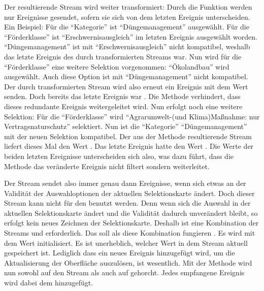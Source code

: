 Der resultierende Stream wird weiter transformiert: Durch die Funktion   werden nur Ereignisse gesendet,
sofern sie sich von dem letzten Ereignis unterscheiden.
Ein Beispiel: Für die \enquote{Kategorie} ist \enquote{Düngemanagement} ausgewählt.
Für die \enquote{Förderklasse} ist \enquote{Erschwernisausgleich} im letzten Ereignis ausgewählt worden.
\enquote{Düngemanagement} ist mit \enquote{Erschwernisausgleich} nicht kompatibel, weshalb das letzte Ereignis des durch  transformierten Streams  war.
Nun wird für die \enquote{Förderklasse} eine weitere Selektion vorgenommen: \enquote{Ökolandbau} wird ausgewählt.
Auch diese Option ist mit \enquote{Düngemanagement} nicht kompatibel.
Der durch  transformierten Stream wird also erneut ein Ereignis mit dem Wert  senden.
Doch bereits das letzte Ereignis war .
Die Methode  verhindert,
dass dieses redundante Ereignis weitergeleitet wird.
Nun erfolgt noch eine weitere Selektion: Für die \enquote{Förderklasse} wird \enquote{Agrarumwelt-(und Klima)Maßnahme: nur Vertragsnaturschutz} selektiert.
Nun ist die \enquote{Kategorie} \enquote{Düngemanagement} mit der neuen Selektion kompatibel.
Der aus der Methode  resultierende Stream liefert dieses Mal den Wert .
Das letzte Ereignis hatte den Wert .
Die Werte der beiden letzten Ereignisse unterscheiden sich also,
was dazu führt,
dass die Methode  das veränderte Ereignis nicht filtert sondern weiterleitet.

Der Stream  sendet also immer genau dann Ereignisse,
wenn sich etwas an der Validität der Auswahloptionen der aktuellen Selektionskarte ändert.
Doch dieser Stream kann nicht für den  benutzt werden.
Denn wenn sich die Auswahl in der aktuellen Selektionskarte ändert
und die Validität dadurch unverändert bleibt,
so erfolgt kein neues Zeichnen der Selektionskarte.
Deshalb ist eine Kombination der Streams  und  erforderlich.
Das   soll als diese Kombination fungieren .
Es wird mit dem Wert  initialisiert.
Es ist unerheblich, welcher Wert in dem Stream aktuell gespeichert ist.
Lediglich dass ein neues Ereignis hinzugefügt wird,
um die Aktualisierung der Oberfläche auszulösen,
ist wesentlich.
Mit der Methode  wird nun sowohl auf den Stream   als auch auf   gehorcht. 
Jedes empfangene Ereignis wird dabei dem   hinzugefügt.

